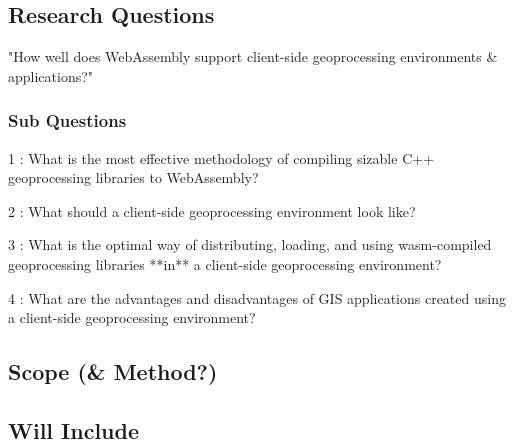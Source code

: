 


\subsection{Research Questions}

"How well does WebAssembly support client-side geoprocessing environments \& applications?"

\subsubsection*{Sub Questions}

1 : What is the most effective methodology of compiling sizable C++ geoprocessing libraries to WebAssembly?

2 : What should a client-side geoprocessing environment look like?

3 : What is the optimal way of distributing, loading, and using wasm-compiled geoprocessing libraries **in** a client-side geoprocessing environment?

4 : What are the advantages and disadvantages of GIS applications created using a client-side geoprocessing environment?

\newpage
\subsection{Scope (\& Method?)}


\subsection*{Will Include}

